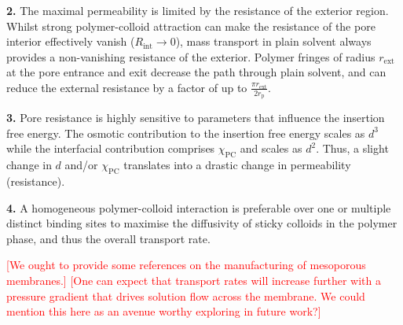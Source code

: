 \documentclass[12pt, a4paper]{article}
\newcommand\todo[1]{\textcolor{red}{#1}}
\begin{document}
\textbf{2.}
The maximal permeability is limited by the resistance of the exterior region.
Whilst strong  polymer-colloid attraction can make the resistance of the pore interior effectively vanish ($R_{\text{int}} \to 0$), mass transport in plain solvent always provides a non-vanishing resistance of the exterior.
Polymer fringes of radius $r_\text{ext}$ at the pore entrance and exit decrease the path through plain solvent, and can reduce the external resistance by a factor of up to $\frac{\pi r_{\text{ext}}}{2 r_{\text{p}}}$.

\textbf{3.}
Pore resistance is highly sensitive to parameters that influence the insertion free energy.
The osmotic contribution to the insertion free energy scales as $d^3$ while the interfacial contribution comprises $\chi_{\text{PC}}$ and scales as $d^2$.
Thus, a slight change in $d$ and/or $\chi_{\text{PC}}$ translates into a drastic change in permeability (resistance).

\textbf{4.}
A homogeneous polymer-colloid interaction is preferable over one or multiple distinct binding sites to maximise the diffusivity of sticky colloids in the polymer phase, and thus the overall transport rate.

\bigskip

\todo{[We ought to provide some references on the manufacturing of mesoporous membranes.]}
\todo{[One can expect that transport rates will increase further with a pressure gradient that drives solution flow across the membrane. We could mention this here as an avenue worthy exploring in future work?]}


\printbibliography
\end{document}
